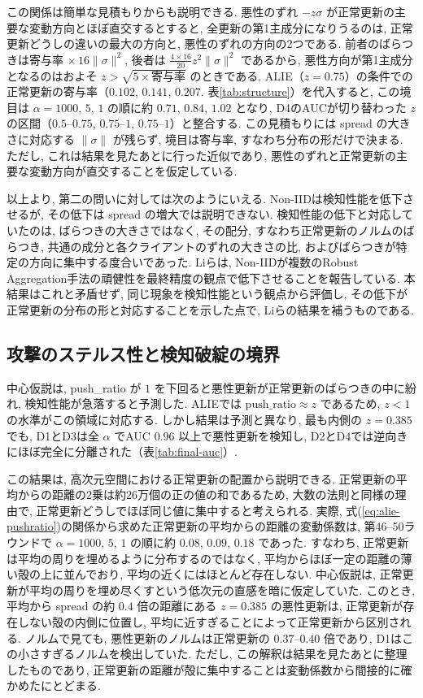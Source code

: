 \documentclass[a4j, twocolumn, dvipdfmx]{jsarticle}
\newcommand{\PushRatio}{\textrm{push\_ratio}}
\newcommand{\Spread}{\textrm{spread}}
\begin{document}
この関係は簡単な見積もりからも説明できる. 悪性のずれ $-z\sigma$ が正常更新の主要な変動方向とほぼ直交するとすると, 全更新の第1主成分になりうるのは, 正常更新どうしの違いの最大の方向と, 悪性のずれの方向の2つである. 前者のばらつきは寄与率 $\times\, 16\|\sigma\|^2$, 後者は $\frac{4 \times 16}{20} z^2 \|\sigma\|^2$ であるから, 悪性方向が第1主成分となるのはおよそ $z > \sqrt{5 \times \text{寄与率}}$ のときである. ALIE（$z=0.75$）の条件での正常更新の寄与率（$0.102$, $0.141$, $0.207$. 表\ref{tab:structure}）を代入すると, この境目は $\alpha=1000,\,5,\,1$ の順に約 $0.71$, $0.84$, $1.02$ となり, D4のAUCが切り替わった $z$ の区間（$0.5$--$0.75$, $0.75$--$1$, $0.75$--$1$）と整合する. この見積もりには \Spread{} の大きさに対応する $\|\sigma\|$ が残らず, 境目は寄与率, すなわち分布の形だけで決まる. ただし, これは結果を見たあとに行った近似であり, 悪性のずれと正常更新の主要な変動方向が直交することを仮定している.

以上より, 第二の問いに対しては次のようにいえる. Non-IIDは検知性能を低下させるが, その低下は \Spread{} の増大では説明できない. 検知性能の低下と対応していたのは, ばらつきの大きさではなく, その配分, すなわち正常更新のノルムのばらつき, 共通の成分と各クライアントのずれの大きさの比, およびばらつきが特定の方向に集中する度合いであった. Liら\cite{li2023experimental}は, Non-IIDが複数のRobust Aggregation手法の頑健性を最終精度の観点で低下させることを報告している. 本結果はこれと矛盾せず, 同じ現象を検知性能という観点から評価し, その低下が正常更新の分布の形と対応することを示した点で, Liらの結果を補うものである.

\subsection{攻撃のステルス性と検知破綻の境界}
\label{sec:disc-rq3}

中心仮説は, \PushRatio{} が $1$ を下回ると悪性更新が正常更新のばらつきの中に紛れ, 検知性能が急落すると予測した. ALIEでは $\PushRatio \approx z$ であるため, $z<1$ の水準がこの領域に対応する. しかし結果は予測と異なり, 最も内側の $z=0.385$ でも, D1とD3は全 $\alpha$ でAUC $0.96$ 以上で悪性更新を検知し, D2とD4では逆向きにほぼ完全に分離された（表\ref{tab:final-auc}）.

この結果は, 高次元空間における正常更新の配置から説明できる. 正常更新の平均からの距離の2乗は約26万個の正の値の和であるため, 大数の法則と同様の理由で, 正常更新どうしでほぼ同じ値に集中すると考えられる. 実際, 式(\ref{eq:alie-pushratio})の関係から求めた正常更新の平均からの距離の変動係数は, 第46--50ラウンドで $\alpha=1000,\,5,\,1$ の順に約 $0.08$, $0.09$, $0.18$ であった. すなわち, 正常更新は平均の周りを埋めるように分布するのではなく, 平均からほぼ一定の距離の薄い殻の上に並んでおり, 平均の近くにはほとんど存在しない. 中心仮説は, 正常更新が平均の周りを埋め尽くすという低次元の直感を暗に仮定していた. このとき, 平均から \Spread{} の約 $0.4$ 倍の距離にある $z=0.385$ の悪性更新は, 正常更新が存在しない殻の内側に位置し, 平均に近すぎることによって正常更新から区別される. ノルムで見ても, 悪性更新のノルムは正常更新の $0.37$--$0.40$ 倍であり, D1はこの小さすぎるノルムを検出していた. ただし, この解釈は結果を見たあとに整理したものであり, 正常更新の距離が殻に集中することは変動係数から間接的に確かめたにとどまる.
\end{document}
